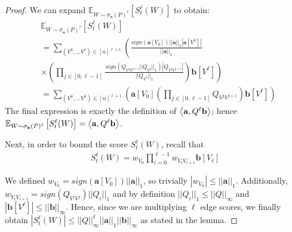 \begin{proof}
We can expand $\mathbb{E}_{W \sim \sigma_{\mathbf{a}}(P)^{\ell}} \left[S_{t}^{\ell}(W)\right]$ to obtain:
\small
\begin{align*}
&\mathbb{E}_{W \sim \sigma_{\mathbf{a}}(P)^{\ell}} \left[S_{t}^{\ell}(W)\right] \\ 
&= \sum_{(V^0, ... V^{\ell}) \in [n]^{\ell+1}} \left(\frac{sign(\mathbf{a}[V_0])||\mathbf{a}||_1|\mathbf{a}[V^0]|}{||\mathbf{a}||_1} \right. \\
&\left. \times \left( \prod_{j \in [0, \ell-1]} \frac{sign(Q_{V^jV^{j+1}}||Q_{V^j}||_1)|Q_{V^jV^{j+1}}|}{||Q_{V^j}||_1} \right) \mathbf{b}[V^{\ell}] \right) \\
& = \sum_{(V^0, ... V^{k}) \in [n]^{\ell+1}} \left(\mathbf{a}[V_0] \left( \prod_{j \in [0,\ell-1]} Q_{V^jV^{j+1}}\right) \mathbf{b}[V^{\ell}] \right)
\end{align*}
\normalsize
The final expression is exactly the definition of $\left< \mathbf{a}, Q^{\ell}\mathbf{b} \right>$; hence $\mathbb{E}_{W \sim \sigma_{\mathbf{a}}(P)^{\ell}} \left[S_{t}^{\ell}(W)\right] = \left< \mathbf{a}, Q^{\ell}\mathbf{b} \right>$.


Next, in order to bound the score $S_{t}^{\ell}(W)$, recall that
\begin{align*}
S_{t}^{\ell}(W) = w_{V_0}\prod_{i=0}^{\ell-1}w_{V_iV_{i+1}}\mathbf{b}[V_{\ell}]
\end{align*}

We defined $w_{V_0} = sign(\mathbf{a}[V_0])||\mathbf{a}||_1$, so trivially $|w_{V_0}| \leq ||\mathbf{a}||_1$.
Additionally, $w_{V_iV_{i+1}} = sign(Q_{V^iV^j})||Q_i||_1 $ and by definition $||Q_i||_1  \leq ||Q||_{\infty}$ and $| \mathbf{b}[V^{\ell}] |\leq ||\mathbf{b}||_\infty$.
Hence, since we are multiplying ${\ell}$ edge scores, we finally obtain
$|S_{t}^{\ell}(W)| \leq ||Q||_{\infty}^{\ell}||\mathbf{a}||_1||\mathbf{b}||_\infty$ as stated in the lemma.
\end{proof}

